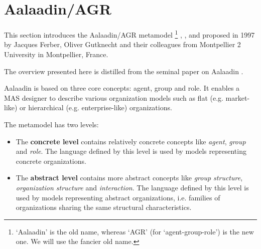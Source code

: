
\section{Aalaadin/AGR}

This section introduces the Aalaadin/AGR metamodel
\footnote{`Aalaadin' is the old name, whereas `AGR' (for `agent-group-role') is the new one. We will use the fancier old name.}
\cite{Ferber97}, \cite{Ferber98}, \cite{Ferber00} and \cite{Ferber03}
proposed in 1997 by Jacques Ferber, Oliver Gutknecht and their colleagues from Montpellier 2 University in Montpellier, France.

The overview presented here is distilled from the seminal paper on Aalaadin \cite{Ferber97}.


Aalaadin is based on three core concepts: agent, group and role.
It enables a MAS designer to describe various organization models such as flat (e.g. market-like) or hierarchical (e.g. enterprise-like) organizations.

The metamodel has two levels:
\begin{itemize}
	\item The \textbf{concrete level} contains relatively concrete concepts like \textit{agent}, \textit{group} and \textit{role}.
	The language defined by this level is used by models representing concrete organizations.
	\item The \textbf{abstract level} contains more abstract concepts like \textit{group structure}, \textit{organization structure} and \textit{interaction}. 
	The language defined by this level is used by models representing abstract organizations, i.e. families of organizations sharing the same structural characteristics.
\end{itemize}

